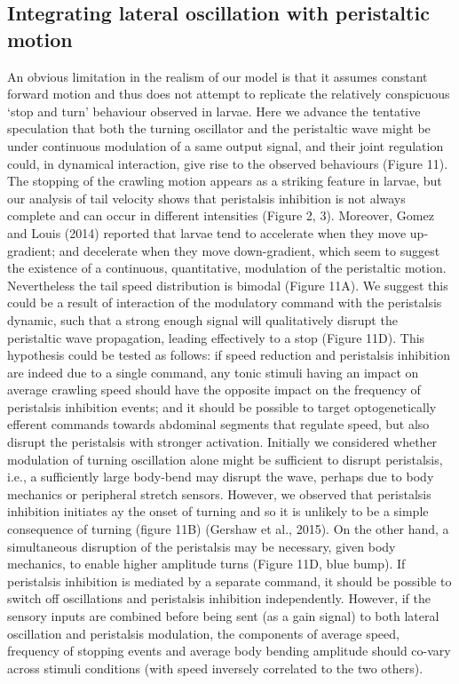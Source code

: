 \documentclass[10pt,a4paper]{article}
\begin{document}
\subsection{Integrating lateral oscillation with peristaltic motion}
An obvious limitation in the realism of our model is that it assumes constant forward motion and thus does not attempt to replicate the relatively conspicuous ‘stop and turn’ behaviour observed in larvae. Here we advance the tentative speculation that both the turning oscillator and the peristaltic wave might be under continuous modulation of a same output signal, and their joint regulation could, in dynamical interaction, give rise to the observed behaviours (Figure 11). The stopping of the crawling motion appears as a striking feature in larvae, but our analysis of tail velocity shows that peristalsis inhibition is not always complete and can occur in different intensities (Figure 2, 3). Moreover, Gomez and Louis (2014) reported that larvae tend to accelerate when they move up-gradient; and decelerate when they move down-gradient, which seem to suggest the existence of a continuous, quantitative, modulation of the peristaltic motion. Nevertheless the tail speed distribution is bimodal (Figure 11A). We suggest this could be a result of interaction of the modulatory command with the peristalsis dynamic, such that a strong enough signal will qualitatively disrupt the peristaltic wave propagation, leading effectively to a stop (Figure 11D). This hypothesis could be tested as follows: if speed reduction and peristalsis inhibition are indeed due to a single command, any tonic stimuli having an impact on average crawling speed should have the opposite impact on the frequency of peristalsis inhibition events; and it should be possible to target optogenetically efferent commands towards abdominal segments that regulate speed, but also disrupt the peristalsis with stronger activation.
Initially we considered whether modulation of turning oscillation alone might be sufficient to disrupt peristalsis, i.e., a sufficiently large body-bend may disrupt the wave, perhaps due to body mechanics or peripheral stretch sensors. However, we observed that peristalsis inhibition initiates ay the onset of turning and so it is unlikely to be a simple consequence of turning (figure 11B) (Gershaw et al., 2015). On the other hand, a simultaneous disruption of the peristalsis may be necessary, given body mechanics, to enable higher amplitude turns (Figure 11D, blue bump). If peristalsis inhibition is mediated by a separate command, it should be possible to switch off oscillations and peristalsis inhibition independently.  However, if the sensory inputs are combined before being sent (as a gain signal) to both lateral oscillation and peristalsis modulation, the components of average speed, frequency of stopping events and average body bending amplitude should co-vary across stimuli conditions (with speed inversely correlated to the two others). 
\end{document}
